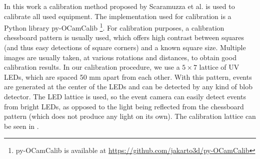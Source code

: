In this work a calibration method proposed by Scaramuzza et al. \cite{scaramuzzacalibration} is used to calibrate all used equipment. The implementation used for calibration is a Python library py-OCamCalib \footnote{py-OCamCalib is available at \url{https://github.com/jakarto3d/py-OCamCalib}}.%
For calibration purposes, a calibration chessboard pattern is usually used, which offers high contrast between squares (and thus easy detections of square corners) and
a known square size. Multiple images are usually taken, at various rotations and distances, to obtain good calibration results.
In our calibration procedure, we use a $5\times7$ lattice of UV LEDs, which are spaced 50 mm apart from each other. With this pattern, events are generated at the center of the
LEDs and can be detected by any kind of blob detector. The LED lattice is used, so the event camera can easily detect events from bright LEDs, as opposed to
the light being reflected from the chessboard pattern (which does not produce any light on its own).
The calibration lattice can be seen in .

